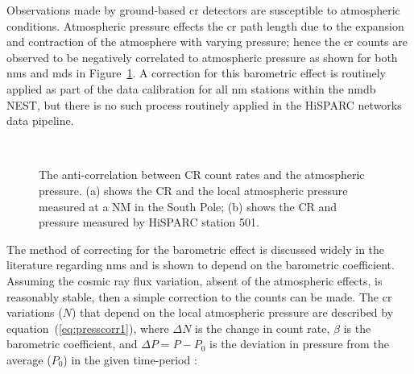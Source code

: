Observations made by ground-based \gls{cr} detectors are susceptible to atmospheric conditions. Atmospheric pressure effects the \gls{cr} path length due to the expansion and contraction of the atmosphere with varying pressure; hence the \gls{cr} counts are observed to be negatively correlated to atmospheric pressure as shown for both \glspl{nm} and \glspl{md} in Figure~\ref{fig:CR_V_P}. A correction for this barometric effect is routinely applied as part of the data calibration for all \gls{nm} stations within the \gls{nmdb} NEST, but there is no such process routinely applied in the HiSPARC networks data pipeline.


\begin{figure}[ht]
	\centering
	 \\
	
	\caption{The anti-correlation between CR count rates and the atmospheric pressure. (a) shows the CR and the local atmospheric pressure measured at a NM in the South Pole; (b) shows the CR and pressure measured by HiSPARC station 501.}
	\label{fig:CR_V_P}
\end{figure}


The method of correcting for the barometric effect is discussed widely in the literature regarding \glspl{nm} and is shown to depend on the barometric coefficient. Assuming the cosmic ray flux variation, absent of the atmospheric effects, is reasonably stable, then a simple correction to the counts can be made. The \gls{cr} variations ($N$) that depend on the local atmospheric pressure are described by equation~(\ref{eq:presscorr1}), where $\Delta N$ is the change in count rate, $\beta$ is the barometric coefficient, and $\Delta P = P - P_0$ is the deviation in pressure from the average ($P_0$) in the given time-period \citep{paschalis_online_2013}:

